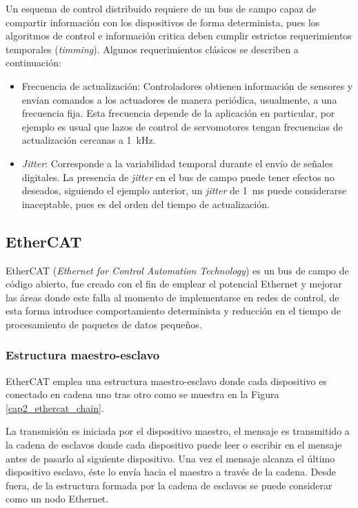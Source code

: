 Un esquema de control distribuido requiere de un bus de campo capaz de compartir información con los dispositivos de forma determinista, pues los algoritmos de control e información critica deben cumplir estrictos requerimientos temporales (\textit{timming}). Algunos requerimientos clásicos se describen a continuación:

\begin{itemize}

\item Frecuencia de actualización: Controladores obtienen información de sensores y envían comandos a los actuadores de manera periódica, usualmente, a una frecuencia fija. Esta frecuencia depende de la aplicación en particular, por ejemplo es usual que lazos de control de servomotores tengan frecuencias de actualización cercanas a \SI{1}{kHz}.

\item \textit{Jitter}: Corresponde a la variabilidad temporal durante el envío de señales digitales. La presencia de \textit{jitter} en el bus de campo puede tener efectos no deseados, siguiendo el ejemplo anterior, un \textit{jitter} de \SI{1}{\milli\second} puede considerarse inaceptable, pues es del orden del tiempo de actualización.

\end{itemize}


\subsection{EtherCAT}

EtherCAT (\textit{Ethernet for Control Automation Technology}) es un bus de campo de código abierto, fue creado con el fin de emplear el potencial Ethernet y mejorar las áreas donde este falla al momento de implementarse en redes de control, de esta forma introduce comportamiento determinista y reducción en el tiempo de procesamiento de paquetes de datos pequeños.

\subsubsection{Estructura maestro-esclavo}

EtherCAT emplea una estructura maestro-esclavo donde cada dispositivo es conectado en cadena uno tras otro como se muestra en la Figura \ref{cap2_ethercat_chain}.

La transmisión es iniciada por el dispositivo maestro, el mensaje es transmitido a la cadena de esclavos donde cada dispositivo puede leer o escribir en el mensaje antes de pasarlo al siguiente dispositivo. Una vez el mensaje alcanza el último dispositivo esclavo, éste lo envía hacia el maestro a través de la cadena. Desde fuera, de la estructura formada por la cadena de esclavos se puede considerar como un nodo Ethernet.

